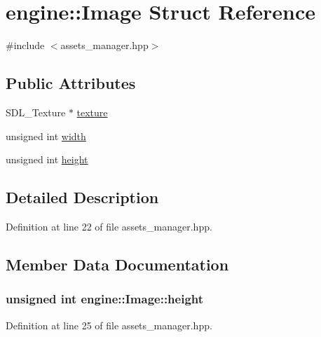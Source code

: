 \hypertarget{structengine_1_1_image}{}\section{engine\+:\+:Image Struct Reference}
\label{structengine_1_1_image}


{\ttfamily \#include $<$assets\+\_\+manager.\+hpp$>$}

\subsection*{Public Attributes}
\begin{DoxyCompactItemize}
\item 
S\+D\+L\+\_\+\+Texture $\ast$ \hyperlink{structengine_1_1_image_a1aba43ce4fe48d3c18e4db97543c1077}{texture}
\item 
unsigned int \hyperlink{structengine_1_1_image_a705d917a73360772b548c2b8a9a47969}{width}
\item 
unsigned int \hyperlink{structengine_1_1_image_a26b454af62aa1652eaf068df70a583b4}{height}
\end{DoxyCompactItemize}


\subsection{Detailed Description}


Definition at line 22 of file assets\+\_\+manager.\+hpp.



\subsection{Member Data Documentation}
\subsubsection[{\texorpdfstring{height}{height}}]{\setlength{\rightskip}{0pt plus 5cm}unsigned int engine\+::\+Image\+::height}\hypertarget{structengine_1_1_image_a26b454af62aa1652eaf068df70a583b4}{}\label{structengine_1_1_image_a26b454af62aa1652eaf068df70a583b4}


Definition at line 25 of file assets\+\_\+manager.\+hpp.

